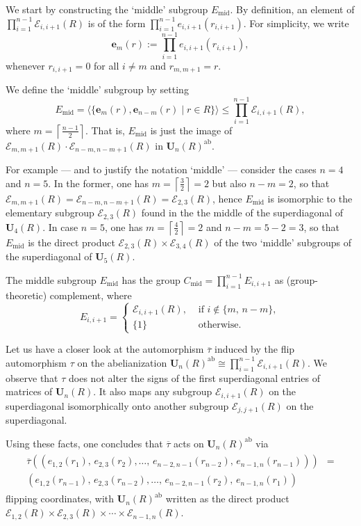 \documentclass[a4paper,11pt]{amsart}
\makeatletter
\numberwithin{equation}{section}
\theoremstyle{plain}
\theoremstyle{definition}
\renewenvironment{proof}[1][\proofname] {\par\pushQED{\qed}\normalfont\topsep6\p@\@plus6\p@\relax\trivlist\item[\hskip\labelsep\bfseries#1\@addpunct{.}]\ignorespaces}{\popQED\endtrivlist\@endpefalse}
\newcommand{\mbU}{\mathbf{U}} %
\newcommand{\barra}[1]{\overline{#1}}
\newcommand{\set}[1]{\{ #1 \}}
\newcommand{\mc}{\mathcal}
\makeatother
\begin{document}
\begin{proof}
We start by constructing the `middle' subgroup $E_{\mathrm{mid}}$. By definition, an element of $\prod_{i=1}^{n-1} \mc{E}_{i,i+1}(R)$ is of the form $\prod_{i=1}^{n-1}e_{i,i+1}(r_{i,i+1})$. For simplicity, we write 
\[\mathbf{e}_m(r) := \prod_{i=1}^{n-1}e_{i,i+1}(r_{i,i+1}),\] whenever $r_{i,i+1}=0$ for all $i \neq m$ and $r_{m,m+1}=r$.

We define the `middle' subgroup by setting 
\[ E_{\mathrm{mid}} = \langle\{ \mathbf{e}_m(r), \mathbf{e}_{n - m}(r) \mid r \in R \} \rangle \leq \prod_{i=1}^{n-1} \mc{E}_{i,i+1}(R),\]
where $m = \left\lceil \frac{n-1}{2} \right\rceil$. 
That is, $E_{\mathrm{mid}}$ is just the image of $\mc{E}_{m, m + 1}(R) \cdot \mc{E}_{n - m, n - m + 1}(R)$ in $\mbU_n(R)^{\mathrm{ab}}$.

For example --- and to justify the notation `middle' --- consider the cases $n = 4$ and $n = 5$. In the former, one has $m = \left\lceil \frac{3}{2} \right\rceil  = 2$ but also $n - m = 2$, so that $\mc{E}_{m, m + 1}(R) = \mc{E}_{n - m, n - m + 1}(R) = \mc{E}_{2, 3}(R)$, hence $E_{\mathrm{mid}}$ is isomorphic to the elementary subgroup $\mc{E}_{2,3}(R)$ found in the the middle of the superdiagonal of $\mbU_4(R)$. In case $n = 5$, one has $m = \left\lceil \frac{4}{2} \right\rceil  = 2$ and $n-m=5-2=3$, so that $E_{\mathrm{mid}}$ is the direct product $\mc{E}_{2,3}(R) \times \mc{E}_{3,4}(R)$ of the two `middle' subgroups of the superdiagonal of $\mbU_5(R)$.

The middle subgroup $E_{\mathrm{mid}}$ has the group $C_{\mathrm{mid}} = \prod_{i=1}^{n-1} E_{i,i+1}$ as (group-theoretic) complement, where 
\[ E_{i,i+1} = \begin{cases} \mc{E}_{i,i+1}(R), & \text{ if } i \notin \set{ m, \, n - m }, \\
\set{1} & \text{ otherwise}. \end{cases} \]

Let us have a closer look at the automorphism $\barra{\tau}$ induced by the flip automorphism $\tau$ on the abelianization $\mbU_n(R)^{\mathrm{ab}} \cong \prod_{i=1}^{n-1} \mc{E}_{i,i+1}(R)$.
We observe that $\tau$ does not alter the signs of the first superdiagonal entries of matrices of $\mbU_n(R)$. It also maps any subgroup $\mc{E}_{i,i+1}(R)$ on the superdiagonal isomorphically onto another subgroup $\mc{E}_{j,j+1}(R)$ on the superdiagonal.

Using these facts, one concludes that $\barra{\tau}$ acts on $\mbU_n(R)^{\mathrm{ab}}$ via 
\begin{align} \label{tau1} \begin{split} \barra{\tau}( (e_{1,2}(r_1), \, e_{2,3}(r_2), \ldots, \, e_{n-2,n-1}(r_{n-2}), \, e_{n-1,n}(r_{n-1}) )) & = \\
 (e_{1,2}(r_{n-1}), \, e_{2,3}(r_{n-2}), \ldots, \, e_{n-2,n-1}(r_{2}), \, e_{n-1,n}(r_{1}) ) & \end{split} \end{align}
 flipping coordinates, with $\mbU_n(R)^{\mathrm{ab}}$ written as the direct product $\mc{E}_{1,2}(R) \times \mc{E}_{2,3}(R) \times \cdots \times \mc{E}_{n-1,n}(R)$.



\end{proof}
\end{document}
